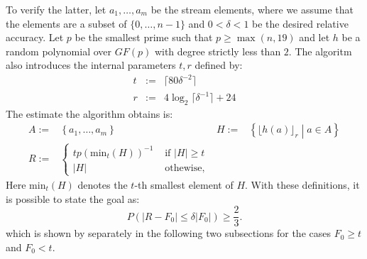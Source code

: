 \documentclass[11pt,a4paper]{article}
\newcommand{\size}[1]{\lvert#1\rvert}
\begin{document}
To verify the latter, let $a_1, \ldots, a_m$ be the stream elements, where we assume that the
elements are a subset of $\{0,\ldots,n-1\}$ and $0 < \delta < 1$ be the desired relative accuracy.
Let $p$ be the smallest prime such that $p \geq \max (n,19)$ and let $h$ be a random polynomial over
$GF(p)$ with degree strictly less than $2$.
The algoritm also introduces the internal parameters $t, r$ defined by:
\begin{eqnarray*}
    t & := & \lceil 80\delta^{-2} \rceil \\
    r & := & 4 \log_2 \lceil \delta^{-1} \rceil + 24
\end{eqnarray*}
The estimate the algorithm obtains is:
\begin{align*}
    A := & \left\{ a_1, \ldots, a_m \right\} &
    H := & \left\{ \lfloor h(a) \rfloor_r \middle \vert a \in A \right\} \\
    R := & \begin{cases} t p \left(\mathrm{min}_t (H) \right)^{-1} & \textrm{ if } \size{H} \geq t \\
    \size{H} & \textrm{ othewise,} \end{cases} &
\end{align*}
Here $\mathrm{min}_t(H)$ denotes the $t$-th smallest element of $H$.
With these definitions, it is possible to state the goal as:
\[
    P(\size{R - F_0} \leq \delta \size{F_0}) \geq \frac{2}{3} \textrm{.}  
\]
which is shown by separately in the following two subsections for the cases $F_0 \geq t$ and $F_0 < t$.
\end{document}
